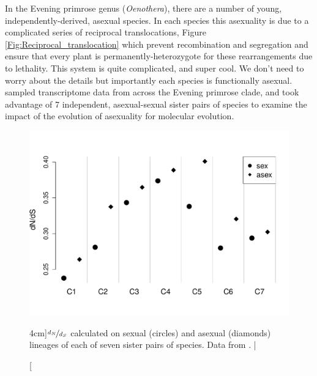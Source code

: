 In the Evening primrose genus ({\it Oenothera}), there are a number of young, independently-derived, asexual species. In each species this asexuality is due to a complicated series of reciprocal translocations, Figure \ref{Fig:Reciprocal_translocation} which prevent recombination and segregation and ensure that every plant is permanently-heterozygote for these rearrangements due to lethality. This system is quite complicated, and super cool. We don't need to worry about the details but importantly each species is functionally asexual. \citet{hollister2014recurrent} sampled transcriptome data from across the Evening primrose clade, and took advantage of 7 independent, asexual-sexual sister pairs of species to examine the impact of the evolution of asexuality for molecular evolution.  
\begin{figure}
\begin{center}
  \includegraphics[width = 0.8 \textwidth]{Journal_figs/recom_selection/evening_primrose/evening_primrose_omega.pdf}
\end{center}
\caption[][4cm]{$\nicefrac{d_N}{d_S}$ calculated on sexual (circles) and asexual (diamonds) lineages of each of seven sister pairs of species. Data from \citet{hollister2014recurrent}. | } \label{fig:evening_primrose_omega}  %
\end{figure}

